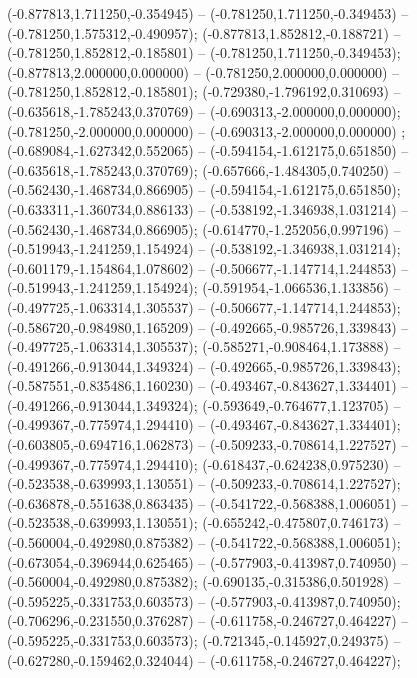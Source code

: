  (-0.877813,1.711250,-0.354945) -- (-0.781250,1.711250,-0.349453) -- (-0.781250,1.575312,-0.490957);
 (-0.877813,1.852812,-0.188721) -- (-0.781250,1.852812,-0.185801) -- (-0.781250,1.711250,-0.349453);
 (-0.877813,2.000000,0.000000) -- (-0.781250,2.000000,0.000000) -- (-0.781250,1.852812,-0.185801);
 (-0.729380,-1.796192,0.310693) -- (-0.635618,-1.785243,0.370769) -- (-0.690313,-2.000000,0.000000);
 (-0.781250,-2.000000,0.000000) -- (-0.690313,-2.000000,0.000000) ;
 (-0.689084,-1.627342,0.552065) -- (-0.594154,-1.612175,0.651850) -- (-0.635618,-1.785243,0.370769);
 (-0.657666,-1.484305,0.740250) -- (-0.562430,-1.468734,0.866905) -- (-0.594154,-1.612175,0.651850);
 (-0.633311,-1.360734,0.886133) -- (-0.538192,-1.346938,1.031214) -- (-0.562430,-1.468734,0.866905);
 (-0.614770,-1.252056,0.997196) -- (-0.519943,-1.241259,1.154924) -- (-0.538192,-1.346938,1.031214);
 (-0.601179,-1.154864,1.078602) -- (-0.506677,-1.147714,1.244853) -- (-0.519943,-1.241259,1.154924);
 (-0.591954,-1.066536,1.133856) -- (-0.497725,-1.063314,1.305537) -- (-0.506677,-1.147714,1.244853);
 (-0.586720,-0.984980,1.165209) -- (-0.492665,-0.985726,1.339843) -- (-0.497725,-1.063314,1.305537);
 (-0.585271,-0.908464,1.173888) -- (-0.491266,-0.913044,1.349324) -- (-0.492665,-0.985726,1.339843);
 (-0.587551,-0.835486,1.160230) -- (-0.493467,-0.843627,1.334401) -- (-0.491266,-0.913044,1.349324);
 (-0.593649,-0.764677,1.123705) -- (-0.499367,-0.775974,1.294410) -- (-0.493467,-0.843627,1.334401);
 (-0.603805,-0.694716,1.062873) -- (-0.509233,-0.708614,1.227527) -- (-0.499367,-0.775974,1.294410);
 (-0.618437,-0.624238,0.975230) -- (-0.523538,-0.639993,1.130551) -- (-0.509233,-0.708614,1.227527);
 (-0.636878,-0.551638,0.863435) -- (-0.541722,-0.568388,1.006051) -- (-0.523538,-0.639993,1.130551);
 (-0.655242,-0.475807,0.746173) -- (-0.560004,-0.492980,0.875382) -- (-0.541722,-0.568388,1.006051);
 (-0.673054,-0.396944,0.625465) -- (-0.577903,-0.413987,0.740950) -- (-0.560004,-0.492980,0.875382);
 (-0.690135,-0.315386,0.501928) -- (-0.595225,-0.331753,0.603573) -- (-0.577903,-0.413987,0.740950);
 (-0.706296,-0.231550,0.376287) -- (-0.611758,-0.246727,0.464227) -- (-0.595225,-0.331753,0.603573);
 (-0.721345,-0.145927,0.249375) -- (-0.627280,-0.159462,0.324044) -- (-0.611758,-0.246727,0.464227);
